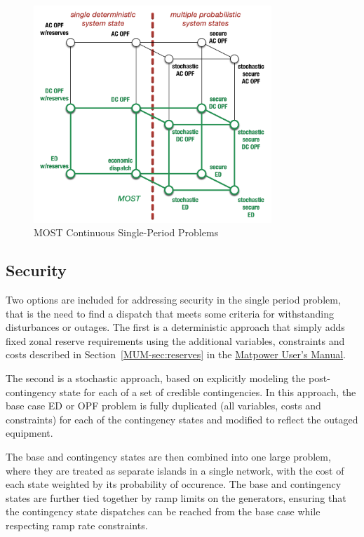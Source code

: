 \documentclass[12pt]{article}
\newcommand{\mpver}[0]{6.1-dev}
\newcommand{\matpower}[0]{{\sc Matpower}}
\newcommand{\mumurl}[0]{http://www.pserc.cornell.edu/matpower/docs/MATPOWER-manual-\mpver.pdf}
\newcommand{\mum}[0]{\href{\mumurl}{\matpower{} User's Manual}}
\numberwithin{equation}{section}
\numberwithin{table}{section}
\numberwithin{figure}{section}
\begin{document}
\begin{figure}[hbtp]
  \centering
\includegraphics[width=0.8\textwidth]{./figures/most-single-period-problems-16}
  \caption{MOST Continuous Single-Period Problems}
  \label{fig:most_single_period}
\end{figure}

\subsection{Security}

Two options are included for addressing security in the single period problem, that is the need to find a dispatch that meets some criteria for withstanding disturbances or outages. The first is a deterministic approach that simply adds fixed zonal reserve requirements using the additional variables, constraints and costs described in Section~\ref{MUM-sec:reserves} in the \mum{}.

The second is a stochastic approach, based on explicitly modeling the post-contingency state for each of a set of credible contingencies. In this approach, the base case ED or OPF problem is fully duplicated (all variables, costs and constraints) for each of the contingency states and modified to reflect the outaged equipment.

The base and contingency states are then combined into one large problem, where they are treated as separate islands in a single network, with the cost of each state weighted by its probability of occurence. The base and contingency states are further tied together by ramp limits on the generators, ensuring that the contingency state dispatches can be reached from the base case while respecting ramp rate constraints.
\end{document}
